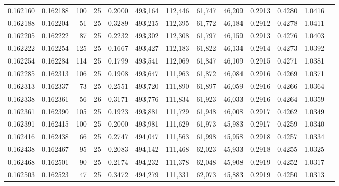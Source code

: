 \begin{tabular}{rrrrrrrrrrrrr}
0.162160 & 0.162188 &   100 &  25 &                                     0.2000 & 493,164 & 112,446 &  61,747 &  46,209 & 0.2913 & 0.4280 & 1.0416 \\
0.162188 & 0.162204 &    51 &  25 &                                     0.3289 & 493,215 & 112,395 &  61,772 &  46,184 & 0.2912 & 0.4278 & 1.0411 \\
0.162205 & 0.162222 &    87 &  25 &                                     0.2232 & 493,302 & 112,308 &  61,797 &  46,159 & 0.2913 & 0.4276 & 1.0403 \\
0.162222 & 0.162254 &   125 &  25 &                                     0.1667 & 493,427 & 112,183 &  61,822 &  46,134 & 0.2914 & 0.4273 & 1.0392 \\
0.162254 & 0.162284 &   114 &  25 &                                     0.1799 & 493,541 & 112,069 &  61,847 &  46,109 & 0.2915 & 0.4271 & 1.0381 \\
0.162285 & 0.162313 &   106 &  25 &                                     0.1908 & 493,647 & 111,963 &  61,872 &  46,084 & 0.2916 & 0.4269 & 1.0371 \\
0.162313 & 0.162337 &    73 &  25 &                                     0.2551 & 493,720 & 111,890 &  61,897 &  46,059 & 0.2916 & 0.4266 & 1.0364 \\
0.162338 & 0.162361 &    56 &  26 &                                     0.3171 & 493,776 & 111,834 &  61,923 &  46,033 & 0.2916 & 0.4264 & 1.0359 \\
0.162361 & 0.162390 &   105 &  25 &                                     0.1923 & 493,881 & 111,729 &  61,948 &  46,008 & 0.2917 & 0.4262 & 1.0349 \\
0.162391 & 0.162415 &   100 &  25 &                                     0.2000 & 493,981 & 111,629 &  61,973 &  45,983 & 0.2917 & 0.4259 & 1.0340 \\
0.162416 & 0.162438 &    66 &  25 &                                     0.2747 & 494,047 & 111,563 &  61,998 &  45,958 & 0.2918 & 0.4257 & 1.0334 \\
0.162438 & 0.162467 &    95 &  25 &                                     0.2083 & 494,142 & 111,468 &  62,023 &  45,933 & 0.2918 & 0.4255 & 1.0325 \\
0.162468 & 0.162501 &    90 &  25 &                                     0.2174 & 494,232 & 111,378 &  62,048 &  45,908 & 0.2919 & 0.4252 & 1.0317 \\
0.162503 & 0.162523 &    47 &  25 &                                     0.3472 & 494,279 & 111,331 &  62,073 &  45,883 & 0.2919 & 0.4250 & 1.0313 \\

\end{tabular}
